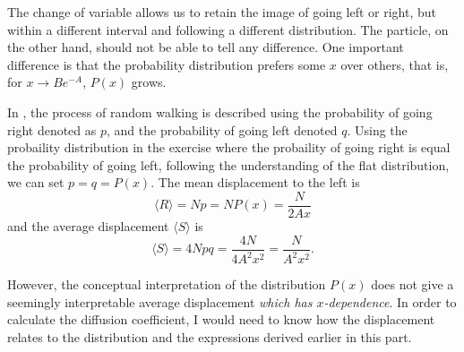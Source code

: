 \documentclass[a4paper,11pt]{article}
\begin{document}
\begin{enumerate}
        The change of variable allows us to retain the image of going left or right, but within a different interval and following a different distribution. The particle, on the other hand, should not be able to tell any difference. One important difference is that the probability distribution prefers some $x$ over others, that is, for $x \to Be^{-A}$, $P(x)$ grows.  

        In \citet{2014Flekkoy}, the process of random walking is described using the probability of going right denoted as $p$, and the probability of going left denoted $q$. Using the probaility distribution in the exercise where the probaility of going right is equal the probability of going left, following the understanding of the flat distribution, we can set $p = q = P(x)$. The mean displacement to the left is 
        \begin{equation}
            \langle R \rangle = Np = NP(x) = \frac{N}{2Ax}
            \label{eq:average_right}
        \end{equation}
and the average displacement $\langle S \rangle$ is
\begin{equation}
    \langle S \rangle = 4Npq = \frac{4N}{4A^2 x^2} = \frac{N}{A^2x^2}.
    \label{eq:avgdispl}
\end{equation}

However, the conceptual interpretation of the distribution $P(x)$ does not give a seemingly interpretable average displacement \textit{which has $x$-dependence}. In order to calculate the diffusion coefficient, I would need to know how the displacement relates to the distribution and the expressions derived earlier in this part.

\end{enumerate}



%
%

%

%
\end{document}
